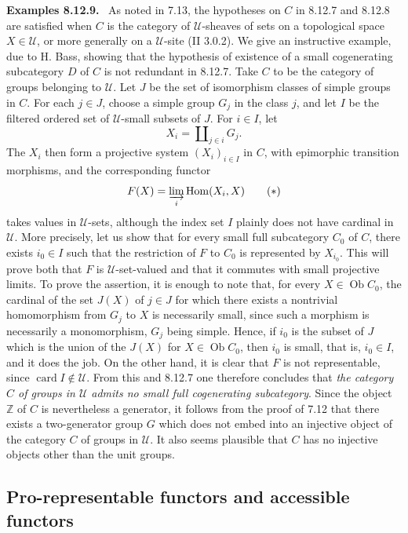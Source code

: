 \documentclass[11pt]{article}
\newcommand{\U}{\mathcal{U}}
\newcommand{\Ob}{\operatorname{Ob}}
\newcommand{\Hom}{\operatorname{Hom}}
\newcommand{\card}{\operatorname{card}}
\newcommand{\ZZ}{\mathbb Z}
\newenvironment{statement}[1]{\par\medskip\noindent\textbf{#1.}\ }{\par\medskip}
\begin{document}
\begin{statement}{Examples 8.12.9}
As noted in 7.13, the hypotheses on $C$ in 8.12.7 and 8.12.8 are satisfied when $C$ is the category of $\U$-sheaves of sets on a topological space $X\in\U$, or more generally on a $\U$-site (II 3.0.2). We give an instructive example, due to H. Bass, showing that the hypothesis of existence of a small cogenerating subcategory $D$ of $C$ is not redundant in 8.12.7. Take $C$ to be the category of groups belonging to $\U$. Let $J$ be the set of isomorphism classes of simple groups in $C$. For each $j\in J$, choose a simple group $G_j$ in the class $j$, and let $I$ be the filtered ordered set of $\U$-small subsets of $J$. For $i\in I$, let
\[
 X_i=\amalg_{j\in i}G_j.
\]
The $X_i$ then form a projective system $(X_i)_{i\in I}$ in $C$, with epimorphic transition morphisms, and the corresponding functor
\[
 F(X)=\varinjlim_i\Hom(X_i,X)
\tag{$*$}
\]
takes values in $\U$-sets, although the index set $I$ plainly does not have cardinal in $\U$. More precisely, let us show that for every small full subcategory $C_0$ of $C$, there exists $i_0\in I$ such that the restriction of $F$ to $C_0$ is represented by $X_{i_0}$. This will prove both that $F$ is $\U$-set-valued and that it commutes with small projective limits. To prove the assertion, it is enough to note that, for every $X\in\Ob C_0$, the cardinal of the set $J(X)$ of $j\in J$ for which there exists a nontrivial homomorphism from $G_j$ to $X$ is necessarily small, since such a morphism is necessarily a monomorphism, $G_j$ being simple. Hence, if $i_0$ is the subset of $J$ which is the union of the $J(X)$ for $X\in\Ob C_0$, then $i_0$ is small, that is, $i_0\in I$, and it does the job. On the other hand, it is clear that $F$ is not representable, since $\card I\notin\U$. From this and 8.12.7 one therefore concludes that \emph{the category $C$ of groups in $\U$ admits no small full cogenerating subcategory}. Since the object $\ZZ$ of $C$ is nevertheless a generator, it follows from the proof of 7.12 that there exists a two-generator group $G$ which does not embed into an injective object of the category $C$ of groups in $\U$. It also seems plausible that $C$ has no injective objects other than the unit groups.
\end{statement}

\subsection{Pro-representable functors and accessible functors}
\end{document}

